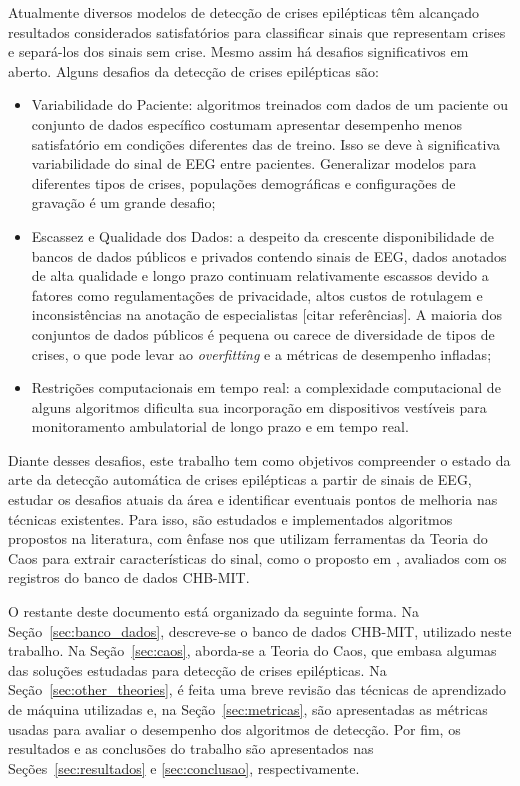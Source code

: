 \documentclass[]{article}
\begin{document}
	Atualmente diversos modelos de detecção de crises epilépticas têm alcançado resultados considerados satisfatórios para classificar sinais que representam crises e separá-los dos sinais sem crise. Mesmo assim há desafios significativos em aberto. Alguns desafios da detecção de crises epilépticas são:
	\begin{itemize}
		\item Variabilidade do Paciente: algoritmos treinados com dados de um paciente ou conjunto de dados específico costumam apresentar desempenho menos satisfatório em condições diferentes das de treino. Isso se deve à significativa variabilidade do sinal de EEG entre pacientes. Generalizar modelos para diferentes tipos de crises, populações demográficas e configurações de gravação é um grande desafio;
		\item Escassez e Qualidade dos Dados: a despeito da crescente disponibilidade de bancos de dados públicos e privados contendo sinais de EEG, dados anotados de alta qualidade e longo prazo continuam relativamente escassos devido a fatores como regulamentações de privacidade, altos custos de rotulagem e inconsistências na anotação de especialistas [citar referências]. A maioria dos conjuntos de dados públicos é pequena ou carece de diversidade de tipos de crises, o que pode levar ao \textit{overfitting} e a métricas de desempenho infladas;
		\item Restrições computacionais em tempo real: a complexidade computacional de alguns algoritmos dificulta sua incorporação em dispositivos vestíveis para monitoramento ambulatorial de longo prazo e em tempo real.
	\end{itemize}

	Diante desses desafios, este trabalho tem como objetivos compreender o estado da arte da detecção automática de crises epilépticas a partir de sinais de EEG, estudar os desafios atuais da área e identificar eventuais pontos de melhoria nas técnicas existentes. Para isso, são estudados e implementados algoritmos propostos na literatura, com ênfase nos que utilizam ferramentas da Teoria do Caos para extrair características do sinal, como o proposto em \cite{zabihi2015analysis}, avaliados com os registros do banco de dados CHB-MIT.

	O restante deste documento está organizado da seguinte forma. Na Seção~\ref{sec:banco_dados}, descreve-se o banco de dados CHB-MIT, utilizado neste trabalho. Na Seção~\ref{sec:caos}, aborda-se a Teoria do Caos, que embasa algumas das soluções estudadas para detecção de crises epilépticas. Na Seção~\ref{sec:other_theories}, é feita uma breve revisão das técnicas de aprendizado de máquina utilizadas e, na Seção~\ref{sec:metricas}, são apresentadas as métricas usadas para avaliar o desempenho dos algoritmos de detecção. Por fim, os resultados e as conclusões do trabalho são apresentados nas Seções~\ref{sec:resultados} e \ref{sec:conclusao}, respectivamente.
\end{document}
